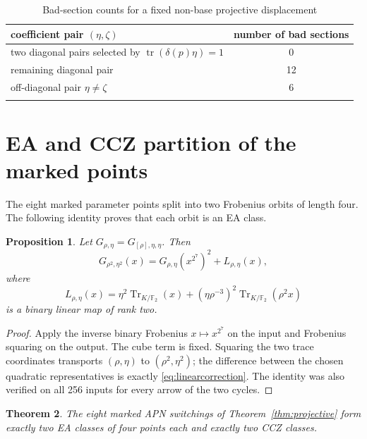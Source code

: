\documentclass[pdflatex,sn-mathphys-num]{sn-jnl}
\theoremstyle{thmstyleone}
\newtheorem{theorem}{Theorem}[section]
\newtheorem{proposition}[theorem]{Proposition}
\theoremstyle{thmstyletwo}
\theoremstyle{thmstylethree}
\newcommand{\F}{\mathbb F}
\newcommand{\Tr}{\operatorname{Tr}}
\newcommand{\tr}{\operatorname{tr}}
\begin{document}
\begin{table}[ht]
\caption{Bad-section counts for a fixed non-base projective displacement}\label{tab:badcounts}
\begin{tabular*}{\textwidth}{@{\extracolsep\fill}lc}
\toprule
coefficient pair $(\eta,\zeta)$ & number of bad sections\\
\midrule
two diagonal pairs selected by $\tr(\delta(p)\eta)=1$ & 0\\
remaining diagonal pair & 12\\
off-diagonal pair $\eta\ne\zeta$ & 6\\
\botrule
\end{tabular*}
\end{table}

\section{EA and CCZ partition of the marked points}\label{sec:partition}

The eight marked parameter points split into two Frobenius orbits of length four.  The following identity proves that each orbit is an EA class.

\begin{proposition}\label{prop:EAcycle}
Let $G_{\rho,\eta}=G_{[\rho],\eta,\eta}$.  Then
\begin{equation}\label{eq:EAwitness}
 G_{\rho^2,\eta^2}(x)
 =G_{\rho,\eta}(x^{2^7})^2+L_{\rho,\eta}(x),
\end{equation}
where
\begin{equation}\label{eq:linearcorrection}
 L_{\rho,\eta}(x)
 =\eta^2\Tr_{K/\F_2}(x)
 +(\eta\rho^{-3})^2\Tr_{K/\F_2}(\rho^2x)
\end{equation}
is a binary linear map of rank two.
\end{proposition}

\begin{proof}
Apply the inverse binary Frobenius $x\mapsto x^{2^7}$ on the input and Frobenius squaring on the output.  The cube term is fixed.  Squaring the two trace coordinates transports $(\rho,\eta)$ to $(\rho^2,\eta^2)$; the difference between the chosen quadratic representatives is exactly \eqref{eq:linearcorrection}.  The identity was also verified on all 256 inputs for every arrow of the two cycles.
\end{proof}

\begin{theorem}\label{thm:partition}
The eight marked APN switchings of Theorem~\ref{thm:projective} form exactly two EA classes of four points each and exactly two CCZ classes.
\end{theorem}
\end{document}

